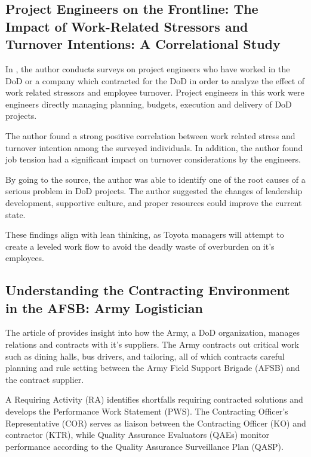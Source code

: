 \documentclass{article}
\begin{document}
	\subsection{Project Engineers on the Frontline: The Impact of Work-Related Stressors and Turnover Intentions: A Correlational Study \cite{Turner2024}}

		In \cite{Turner2024}, the author conducts surveys on project engineers who have worked in the DoD or a company which contracted for the DoD in order to analyze the effect of work related stressors and employee turnover.
		Project engineers in this work were engineers directly managing planning, budgets, execution and delivery of DoD projects.
		
		The author found a strong positive correlation between work related stress and turnover intention among the surveyed individuals.
		In addition, the author found job tension had a significant impact on turnover considerations by the engineers.

		By going to the source, the author was able to identify one of the root causes of a serious problem in DoD projects. 
		The author suggested the changes of leadership development, supportive culture, and proper resources could improve the current state. 

		These findings align with lean thinking, as Toyota managers will attempt to create a leveled work flow to avoid the deadly waste of overburden on it's employees. 
	


	\subsection{Understanding the Contracting Environment in the AFSB: Army Logistician \cite{Carlstedt2020}}

		The article of \cite{Carlstedt2020} provides insight into how the Army, a DoD organization, manages relations and contracts with it's suppliers.
		The Army contracts out critical work such as dining halls, bus drivers, and tailoring, all of which contracts careful planning and rule setting between the Army Field Support Brigade (AFSB) and the contract supplier. 

		A Requiring Activity (RA) identifies shortfalls requiring contracted solutions and develops the Performance Work Statement (PWS). 
		The Contracting Officer's Representative (COR) serves as liaison between the Contracting Officer (KO) and contractor (KTR), while Quality Assurance Evaluators (QAEs) monitor performance according to the Quality Assurance Surveillance Plan (QASP). 
\end{document}
